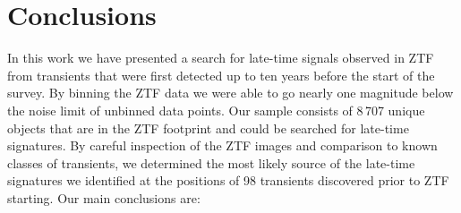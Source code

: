 \documentclass[a4paper,oneside,12pt, class=Latex/Classes/PhDthesisPSnPDF, crop=false]{standalone}
\begin{document}
\section{Conclusions}
\label{conclusions}
In this work we have presented a search for late-time signals observed in ZTF from transients that were first detected up to ten years before the start of the survey. By binning the ZTF data we were able to go nearly one magnitude below the noise limit of unbinned data points. Our sample consists of 8\,707 unique objects that are in the ZTF footprint and could be searched for late-time signatures. By careful inspection of the ZTF images and comparison to known classes of transients, we determined the most likely source of the late-time signatures we identified at the positions of 98 transients discovered prior to ZTF starting. Our main conclusions are:
\end{document}
